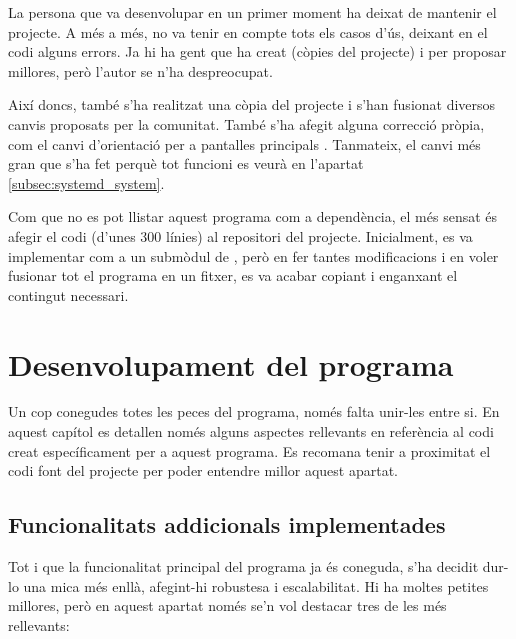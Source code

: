 La persona que va desenvolupar  en un primer moment ha deixat de
mantenir el projecte. A més a més, no va tenir en compte tots els casos
d'ús, deixant en el codi alguns errors. Ja hi ha gent que ha creat 
(còpies del projecte) i  per proposar millores, però
l'autor se n'ha despreocupat.

Així doncs, també s'ha realitzat una còpia del projecte i s'han fusionat diversos
canvis proposats per la comunitat. També s'ha afegit alguna correcció pròpia,
com el canvi d'orientació per a pantalles principals \cite{PyrandrOwn}. Tanmateix,
el canvi més gran que s'ha fet perquè tot funcioni es veurà en l'apartat 
\ref{subsec:systemd_system}.

Com que no es pot llistar aquest programa com a dependència, el més sensat és
afegir el codi (d'unes 300 línies) al repositori del projecte. Inicialment,
es va implementar com a un submòdul de , però en fer tantes
modificacions i en voler fusionar tot el programa en un fitxer, es va acabar
copiant i enganxant el contingut necessari.

\section{Desenvolupament del programa}

Un cop conegudes totes les peces del programa, només falta unir-les entre si. En
aquest capítol es detallen només alguns aspectes rellevants en referència al codi
creat específicament per a aquest programa. Es recomana tenir a proximitat el
codi font del projecte per poder entendre millor aquest apartat.

\subsection{Funcionalitats addicionals implementades}

Tot i que la funcionalitat principal del programa ja és coneguda, s'ha decidit
dur-lo una mica més enllà, afegint-hi robustesa i escalabilitat. Hi ha moltes
petites millores, però en aquest apartat només se'n vol destacar tres de les més
rellevants:

